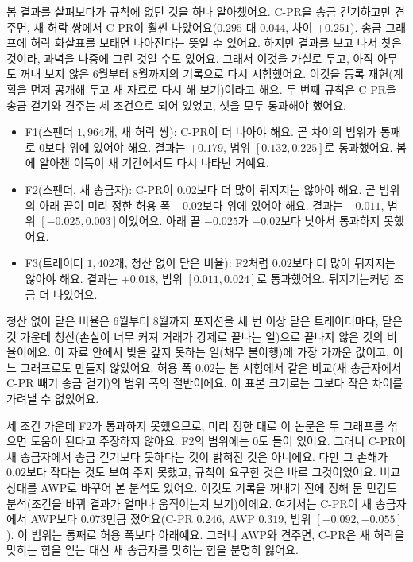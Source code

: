 봄 결과를 살펴보다가 규칙에 없던 것을 하나 알아챘어요. C-PR을 송금 걷기하고만 견주면, 새 허락 쌍에서 C-PR이 훨씬 나았어요($0.295$ 대 $0.044$, 차이 $+0.251$). 송금 그래프에 허락 화살표를 보태면 나아진다는 뜻일 수 있어요. 하지만 결과를 보고 나서 찾은 것이라, 과녁을 나중에 그린 것일 수도 있어요. 그래서 이것을 가설로 두고, 아직 아무도 꺼내 보지 않은 6월부터 8월까지의 기록으로 다시 시험했어요. 이것을 등록 재현(계획을 먼저 공개해 두고 새 자료로 다시 해 보기)이라고 해요. 두 번째 규칙은 C-PR을 송금 걷기와 견주는 세 조건으로 되어 있었고, 셋을 모두 통과해야 했어요.
\begin{itemize}
\item F1(스펜더 $1{,}964$개, 새 허락 쌍): C-PR이 더 나아야 해요. 곧 차이의 범위가 통째로 0보다 위에 있어야 해요. 결과는 $+0.179$, 범위 $[0.132,0.225]$로 통과했어요. 봄에 알아챈 이득이 새 기간에서도 다시 나타난 거예요.
\item F2(스펜더, 새 송금자): C-PR이 $0.02$보다 더 많이 뒤지지는 않아야 해요. 곧 범위의 아래 끝이 미리 정한 허용 폭 $-0.02$보다 위에 있어야 해요. 결과는 $-0.011$, 범위 $[-0.025,0.003]$이었어요. 아래 끝 $-0.025$가 $-0.02$보다 낮아서 통과하지 못했어요.
\item F3(트레이더 $1{,}402$개, 청산 없이 닫은 비율): F2처럼 $0.02$보다 더 많이 뒤지지는 않아야 해요. 결과는 $+0.018$, 범위 $[0.011,0.024]$로 통과했어요. 뒤지기는커녕 조금 더 나았어요.
\end{itemize}
청산 없이 닫은 비율은 6월부터 8월까지 포지션을 세 번 이상 닫은 트레이더마다, 닫은 것 가운데 청산(손실이 너무 커져 거래가 강제로 끝나는 일)으로 끝나지 않은 것의 비율이에요. 이 자료 안에서 빚을 갚지 못하는 일(채무 불이행)에 가장 가까운 값이고, 어느 그래프로도 만들지 않았어요. 허용 폭 $0.02$는 봄 시험에서 같은 비교(새 송금자에서 C-PR 빼기 송금 걷기)의 범위 폭의 절반이에요. 이 표본 크기로는 그보다 작은 차이를 가려낼 수 없었어요.

세 조건 가운데 F2가 통과하지 못했으므로, 미리 정한 대로 이 논문은 두 그래프를 섞으면 도움이 된다고 주장하지 않아요. F2의 범위에는 0도 들어 있어요. 그러니 C-PR이 새 송금자에서 송금 걷기보다 못하다는 것이 밝혀진 것은 아니에요. 다만 그 손해가 $0.02$보다 작다는 것도 보여 주지 못했고, 규칙이 요구한 것은 바로 그것이었어요. 비교 상대를 AWP로 바꾸어 본 분석도 있어요. 이것도 기록을 꺼내기 전에 정해 둔 민감도 분석(조건을 바꿔 결과가 얼마나 움직이는지 보기)이에요. 여기서는 C-PR이 새 송금자에서 AWP보다 $0.073$만큼 졌어요(C-PR $0.246$, AWP $0.319$, 범위 $[-0.092,-0.055]$). 이 범위는 통째로 허용 폭보다 아래예요. 그러니 AWP와 견주면, C-PR은 새 허락을 맞히는 힘을 얻는 대신 새 송금자를 맞히는 힘을 분명히 잃어요.

